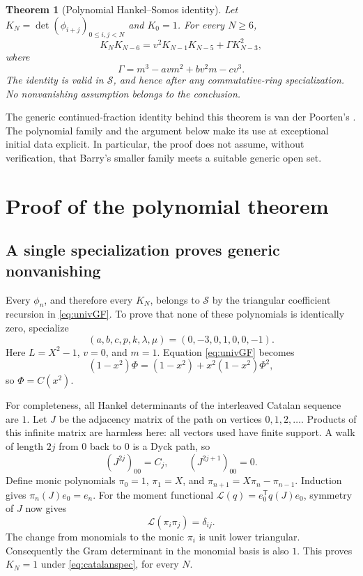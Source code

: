 \documentclass[11pt,a4paper]{article}
\numberwithin{equation}{section}
\newtheorem{theorem}{Theorem}[section]
\theoremstyle{definition}
\begin{document}
\begin{theorem}[Polynomial Hankel--Somos identity]\label{thm:universal}
Let $K_N=\det(\phi_{i+j})_{0\leq i,j<N}$ and $K_0=1$. For every $N\geq6$,
\begin{equation}\label{eq:univH}
 K_NK_{N-6}=v^2K_{N-1}K_{N-5}+\Gamma K_{N-3}^2,
\end{equation}
where
\begin{equation}\label{eq:Gamma}
 \Gamma=m^3-avm^2+bv^2m-cv^3.
\end{equation}
The identity is valid in $\mathcal S$, and hence after any commutative-ring
specialization. No nonvanishing assumption belongs to the conclusion.
\end{theorem}

The generic continued-fraction identity behind this theorem is van der
Poorten's \cite{vdP2005}. The polynomial family and the argument below make
its use at exceptional initial data explicit. In particular, the proof does
not assume, without verification, that Barry's smaller family meets a
suitable generic open set.

\section{Proof of the polynomial theorem}

\subsection{A single specialization proves generic nonvanishing}
Every $\phi_n$, and therefore every $K_N$, belongs to $\mathcal S$ by the
triangular coefficient recursion in \eqref{eq:univGF}. To prove that none of
these polynomials is identically zero, specialize
\begin{equation}\label{eq:catalanspec}
 (a,b,c,p,k,\lambda,\mu)=(0,-3,0,1,0,0,-1).
\end{equation}
Here $L=X^2-1$, $v=0$, and $m=1$. Equation \eqref{eq:univGF} becomes
\[
 (1-x^2)\Phi=(1-x^2)+x^2(1-x^2)\Phi^2,
\]
so $\Phi=C(x^2)$.

For completeness, all Hankel determinants of the interleaved Catalan
sequence are $1$. Let $J$ be the adjacency matrix of the path on vertices
$0,1,2,\ldots$. Products of this infinite matrix are harmless here: all
vectors used have finite support. A walk of length $2j$ from $0$ back to $0$
is a Dyck path, so
\[
 (J^{2j})_{00}=C_j,\qquad (J^{2j+1})_{00}=0.
\]
Define monic polynomials $\pi_0=1$, $\pi_1=X$, and
$\pi_{n+1}=X\pi_n-\pi_{n-1}$. Induction gives $\pi_n(J)e_0=e_n$.
For the moment functional $\mathcal L(q)=e_0^{\mathsf T}q(J)e_0$, symmetry of
$J$ now gives
\[
 \mathcal L(\pi_i\pi_j)=\delta_{ij}.
\]
The change from monomials to the monic $\pi_i$ is unit lower triangular.
Consequently the Gram determinant in the monomial basis is also $1$.
This proves $K_N=1$ under \eqref{eq:catalanspec}, for every $N$.
\end{document}
